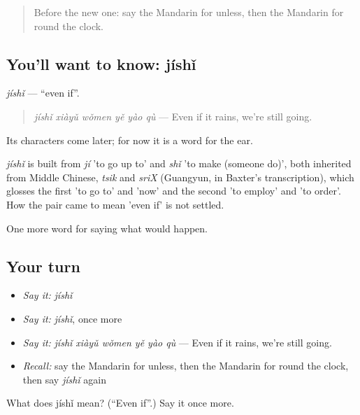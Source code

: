 \label{lesson:ZH-C396-jishi}



\begin{quote}
Before the new one: say the Mandarin for unless, then the Mandarin for round the clock.
\end{quote}

\subsection*{You'll want to know: jíshǐ}
\emph{jíshǐ} — \textquotedblleft{}even if\textquotedblright{}.

\begin{quote}
\emph{jíshǐ xiàyǔ wǒmen yě yào qù} — Even if it rains, we're still going.
\end{quote}

Its characters come later; for now it is a word for the ear.

\begin{cousinweb}
\emph{jíshǐ} is built from \emph{jí} 'to go up to' and \emph{shǐ} 'to make (someone do)', both inherited from Middle Chinese, \emph{tsik} and \emph{sriX} (Guangyun, in Baxter's transcription), which glosses the first 'to go to' and 'now' and the second 'to employ' and 'to order'. How the pair came to mean 'even if' is not settled.
\end{cousinweb}

\begin{grammarlens}[title={What you've built}]
One more word for saying what would happen.
\end{grammarlens}

\subsection*{Your turn}
\begin{itemize}
\raggedright
  \item \emph{Say it:} \emph{jíshǐ}
  \item \emph{Say it:} \emph{jíshǐ}, once more
  \item \emph{Say it:} \emph{jíshǐ xiàyǔ wǒmen yě yào qù} — Even if it rains, we're still going.
  \item \emph{Recall:} say the Mandarin for unless, then the Mandarin for round the clock, then say \emph{jíshǐ} again
\end{itemize}

\begin{tcolorbox}[breakable,colback=teal!4,colframe=teal!35!black,title={Before you move on}]
What does jíshǐ mean? (\textquotedblleft{}Even if\textquotedblright{}.) Say it once more.
\end{tcolorbox}
